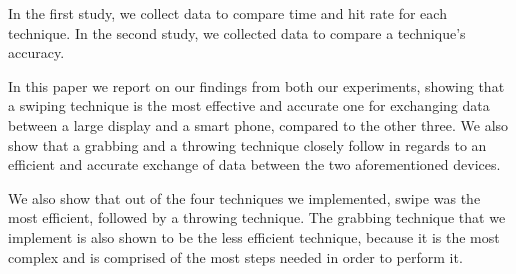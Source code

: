 In the first study, we collect data to compare time and hit rate for each technique.
In the second study, we collected data to compare a technique's accuracy.

In this paper we report on our findings from both our experiments, showing that a swiping technique is the most effective and accurate one for exchanging data between a large display and a smart phone, compared to the other three. 
We also show that a grabbing and a throwing technique closely follow in regards to an efficient and accurate exchange of data between the two aforementioned devices. 

We also show that out of the four techniques we implemented, swipe was the most efficient, followed by a throwing technique. 
The grabbing technique that we implement is also shown to be the less efficient technique, because it is the most complex and is comprised of the most steps needed in order to perform it. 